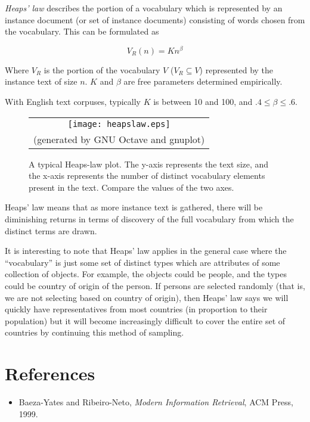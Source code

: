 \documentclass[12pt]{article}
\begin{document}
\emph{Heaps' law} describes the portion of a vocabulary which is represented by an instance document (or set of instance documents) consisting of words chosen from the vocabulary.  This can be formulated as 

$$ V_R(n) = Kn^\beta $$

Where $V_R$ is the portion of the vocabulary $V$ ($V_R \subseteq V$) represented by the instance text of size $n$.  $K$ and $\beta$ are free parameters determined empirically.  

With English text corpuses, typically $K$ is between 10 and 100, and $.4 \le \beta \le .6$.

\begin{center}
\begin{figure}
\begin{tabular}{c}
\texttt{[image: heapslaw.eps]} \\
{\tiny (generated by GNU Octave and gnuplot) }
\end{tabular}
\caption{A typical Heaps-law plot. The y-axis represents the text size, and the x-axis represents the number of distinct vocabulary elements present in the text.  Compare the values of the two axes.}
\end{figure}
\end{center}

Heaps' law means that as more instance text is gathered, there will be diminishing returns in terms of discovery of the full vocabulary from which the distinct terms are drawn.

It is interesting to note that Heaps' law applies in the general case where the ``vocabulary'' is just some set of distinct types which are attributes of some collection of objects.  For example, the objects could be people, and the types could be country of origin of the person.  If persons are selected randomly (that is, we are not selecting based on country of origin), then Heaps' law says we will quickly have representatives from most countries (in proportion to their population) but it will become increasingly difficult to cover the entire set of countries by continuing this method of sampling.

\section{References}

\begin{itemize}

\item Baeza-Yates and Ribeiro-Neto, \emph{Modern Information Retrieval}, ACM Press, 1999.

\end{itemize}
\end{document}

